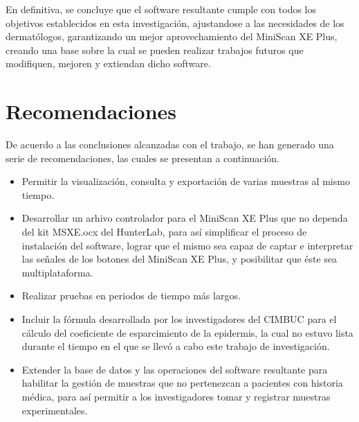 	En definitiva, se concluye que el software resultante cumple con todos los objetivos establecidos en esta investigaci\'{o}n, ajustandose a las necesidades de los dermat\'{o}logos, garantizando un mejor aprovechamiento del MiniScan XE Plus, creando una base sobre la cual se pueden realizar trabajos futuros que modifiquen, mejoren y extiendan dicho software.

\newpage

\section{Recomendaciones}

	De acuerdo a las conclusiones alcanzadas con el trabajo, se han generado una serie de recomendaciones, las cuales se presentan a continuaci\'{o}n.

\begin{itemize}

	\item Permitir la visualizaci\'{o}n, consulta y exportaci\'{o}n de varias muestras al mismo tiempo.
	
	\item Desarrollar un arhivo controlador para el MiniScan XE Plus que no dependa del kit MSXE.ocx del HunterLab, para as\'{i} simplificar el proceso de instalaci\'{o}n del software, lograr que el mismo sea capaz de captar e interpretar las se\~{n}ales de los botones del MiniScan XE Plus, y posibilitar que \'{e}ste sea multiplataforma.
	
	\item Realizar pruebas en periodos de tiempo m\'{a}s largos.
	
	\item Incluir la f\'{o}rmula desarrollada por los investigadores del CIMBUC para el c\'{a}lculo del coeficiente de esparcimiento de la epidermis, la cual no estuvo lista durante el tiempo en el que se llev\'{o} a cabo este trabajo de investigaci\'{o}n.
	
	\item Extender la base de datos y las operaciones del software resultante para habilitar la gesti\'{o}n de muestras que no pertenezcan a pacientes con historia m\'{e}dica, para as\'{i} permitir a los investigadores tomar y registrar muestras experimentales.
\end{itemize}